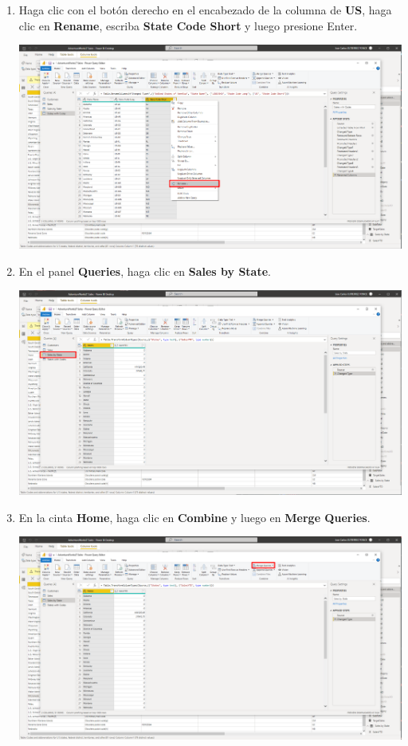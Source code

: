 \documentclass[12pt,letterpaper]{article}
\newcommand\tab[1][1cm]{\hspace*{#1}}
\begin{document}
\begin{enumerate}[\tab 1.]
\begin{center}
        \end{center}
        \item Haga clic con el botón derecho en el encabezado de la columna de \textbf{US}, haga clic en \textbf{Rename}, escriba \textbf{State Code Short} y luego presione Enter.
        \begin{center}
            \includegraphics[width=13cm]{./img/img68.png}
        \end{center}
        \item En el panel \textbf{Queries}, haga clic en \textbf{Sales by State}.
        \begin{center}
            \includegraphics[width=13cm]{./img/img69.png}
        \end{center}
        \item En la cinta \textbf{Home}, haga clic en \textbf{Combine} y luego en \textbf{Merge Queries}.
        \begin{center}
            \includegraphics[width=13cm]{./img/img70.png}

\end{center}
\end{enumerate}
\end{document}
